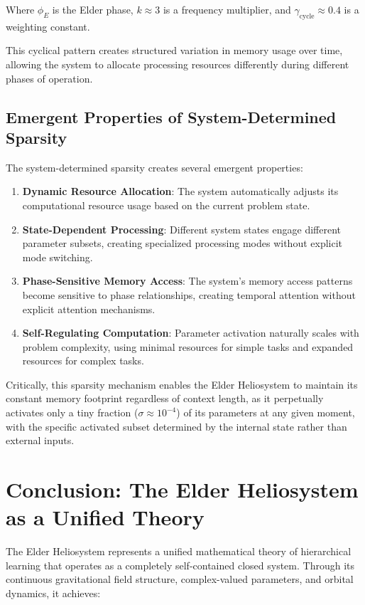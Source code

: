 Where $\phi_E$ is the Elder phase, $k \approx 3$ is a frequency multiplier, and $\gamma_{\text{cycle}} \approx 0.4$ is a weighting constant.

This cyclical pattern creates structured variation in memory usage over time, allowing the system to allocate processing resources differently during different phases of operation.

\subsection{Emergent Properties of System-Determined Sparsity}

The system-determined sparsity creates several emergent properties:

\begin{enumerate}
    \item \textbf{Dynamic Resource Allocation}: The system automatically adjusts its computational resource usage based on the current problem state.
    
    \item \textbf{State-Dependent Processing}: Different system states engage different parameter subsets, creating specialized processing modes without explicit mode switching.
    
    \item \textbf{Phase-Sensitive Memory Access}: The system's memory access patterns become sensitive to phase relationships, creating temporal attention without explicit attention mechanisms.
    
    \item \textbf{Self-Regulating Computation}: Parameter activation naturally scales with problem complexity, using minimal resources for simple tasks and expanded resources for complex tasks.
\end{enumerate}

Critically, this sparsity mechanism enables the Elder Heliosystem to maintain its constant memory footprint regardless of context length, as it perpetually activates only a tiny fraction ($\sigma \approx 10^{-4}$) of its parameters at any given moment, with the specific activated subset determined by the internal state rather than external inputs.

\section{Conclusion: The Elder Heliosystem as a Unified Theory}

The Elder Heliosystem represents a unified mathematical theory of hierarchical learning that operates as a completely self-contained closed system. Through its continuous gravitational field structure, complex-valued parameters, and orbital dynamics, it achieves:

